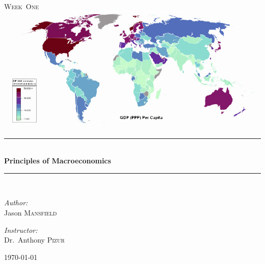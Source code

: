 \documentclass[pdftex,12pt,a4paper]{report}
\newcommand{\HRule}{\rule{\linewidth}{0.5mm}}
\begin{document}
%
\begin{titlepage}
\begin{center}


\textsc{\color{Sepia}{\LARGE EC~320}}\\[1.5cm]
\textsc{\Large Week~One}\\[0.5cm]
\includegraphics[scale=0.5]{GDP}\\
\cite{wiki:001}
\HRule \\[0.4cm]
{ \huge \bfseries Principles of Macroeconomics}\\[0.4cm]
\HRule \\[1.5cm]


\begin{minipage}{0.4\textwidth}
\begin{flushleft} \large
\emph{Author:}\\
Jason \textsc{Mansfield}
\end{flushleft}
\end{minipage}
\begin{minipage}{0.4\textwidth}
\begin{flushright} \large
\emph{Instructor:} \\
Dr.~Anthony \textsc{Pizur}
\end{flushright}
\end{minipage}

\vfill

{\large \today}

\end{center}
\end{titlepage}
%
\clearpage
    \nocite{*}
    
    
\end{document}
